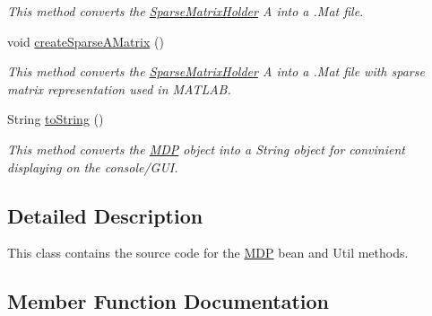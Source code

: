 \begin{DoxyCompactItemize}
\begin{DoxyCompactList}\small\item\em This method converts the \hyperlink{classese_1_1seas_1_1upenn_1_1edu_1_1_sparse_matrix_holder}{Sparse\+Matrix\+Holder} A into a .Mat file. \end{DoxyCompactList}\item 
\hypertarget{classese_1_1seas_1_1upenn_1_1edu_1_1_m_d_p_a51c6b56c16b57e8beb6e78f38909ab11}{}void \hyperlink{classese_1_1seas_1_1upenn_1_1edu_1_1_m_d_p_a51c6b56c16b57e8beb6e78f38909ab11}{create\+Sparse\+A\+Matrix} ()\label{classese_1_1seas_1_1upenn_1_1edu_1_1_m_d_p_a51c6b56c16b57e8beb6e78f38909ab11}

\begin{DoxyCompactList}\small\item\em This method converts the \hyperlink{classese_1_1seas_1_1upenn_1_1edu_1_1_sparse_matrix_holder}{Sparse\+Matrix\+Holder} A into a .Mat file with sparse matrix representation used in M\+A\+T\+L\+A\+B. \end{DoxyCompactList}\item 
\hypertarget{classese_1_1seas_1_1upenn_1_1edu_1_1_m_d_p_a737a653ca7246055a11983d4e2bbc915}{}String \hyperlink{classese_1_1seas_1_1upenn_1_1edu_1_1_m_d_p_a737a653ca7246055a11983d4e2bbc915}{to\+String} ()\label{classese_1_1seas_1_1upenn_1_1edu_1_1_m_d_p_a737a653ca7246055a11983d4e2bbc915}

\begin{DoxyCompactList}\small\item\em This method converts the \hyperlink{classese_1_1seas_1_1upenn_1_1edu_1_1_m_d_p}{M\+D\+P} object into a String object for convinient displaying on the console/\+G\+U\+I. \end{DoxyCompactList}\end{DoxyCompactItemize}


\subsection{Detailed Description}
This class contains the source code for the \hyperlink{classese_1_1seas_1_1upenn_1_1edu_1_1_m_d_p}{M\+D\+P} bean and Util methods. 

\subsection{Member Function Documentation}
\hypertarget{classese_1_1seas_1_1upenn_1_1edu_1_1_m_d_p_ae5da8ca2a3ae73ffc832cb4626ed2ace}{}
